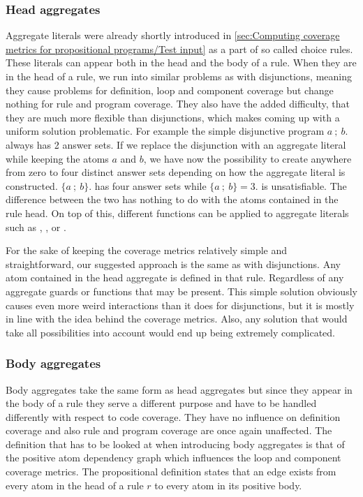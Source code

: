 \subsubsection{Head aggregates}
\label{subsubsec:Coverage for further program classes/Language constructs/Head aggregates}
Aggregate literals were already shortly introduced in \cref{sec:Computing coverage metrics for propositional programs/Test input} as a part of so called choice rules. These literals can appear both in the head and the body of a rule. When they are in the head of a rule, we run into similar problems as with disjunctions, meaning they cause problems for definition, loop and component coverage but change nothing for rule and program coverage. They also have the added difficulty, that they are much more flexible than disjunctions, which makes coming up with a uniform solution problematic. For example the simple disjunctive program \(a\ ;\ b.\) always has 2 answer sets. If we replace the disjunction with an aggregate literal while keeping the atoms $a$ and $b$, we have now the possibility to create anywhere from zero to four distinct answer sets depending on how the aggregate literal is constructed. \(\{a\ ;\ b\}.\) has four answer sets while \(\{a\ ;\ b\} = 3.\) is unsatisfiable. The difference between the two has nothing to do with the atoms contained in the rule head. On top of this, different functions can be applied to aggregate literals such as , ,  or .

For the sake of keeping the coverage metrics relatively simple and straightforward, our suggested approach is the same as with disjunctions. Any atom contained in the head aggregate is defined in that rule. Regardless of 
any aggregate guards or functions that may be present. This simple solution obviously causes even more weird interactions than it does for disjunctions, but it is mostly in line with the idea behind the coverage metrics. Also, any solution that would take all possibilities into account would end up being extremely complicated.

\subsubsection{Body aggregates}
\label{subsubsec:Coverage for further program classes/Language constructs/Body aggregates}
Body aggregates take the same form as head aggregates but since they appear in the body of a rule they serve a different purpose and have to be handled differently with respect to code coverage. They have no influence on definition coverage and also rule and program coverage are once again unaffected. The definition that has to be looked at when introducing body aggregates is that of the positive atom dependency graph which influences the loop and component coverage metrics. The propositional definition states that an edge exists from every atom in the head of a rule $r$ to every atom in its positive body. 



